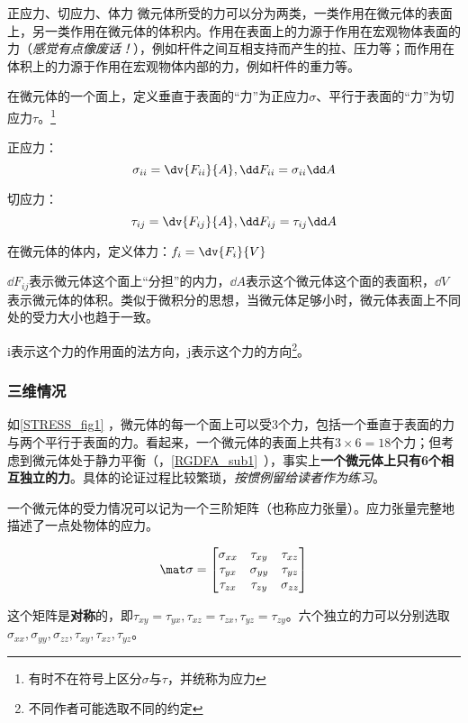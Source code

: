 \begin{definition}{正应力、切应力、体力}
微元体所受的力可以分为两类，一类作用在微元体的表面上，另一类作用在微元体的体积内。作用在表面上的力源于作用在宏观物体表面的力（\textsl{感觉有点像废话！}），例如杆件之间互相支持而产生的拉、压力等；而作用在体积上的力源于作用在宏观物体内部的力，例如杆件的重力等。

在微元体的一个面上，定义垂直于表面的“力”为正应力$\sigma$、平行于表面的“力”为切应力$\tau$。\footnote{有时不在符号上区分$\sigma$与$\tau$，并统称为应力}

正应力：$$\sigma_{ii} =\dv{F_{ii}}{A}, \dd F_{ii} = \sigma_{ii} \dd A$$

切应力：$$\tau_{ij}=\dv{F_{ij}}{A}, \dd F_{ij} = \tau_{ij} \dd A$$

在微元体的体内，定义体力：$f_i = \dv{F_i}{V}$

$\dd F_{ij}$表示微元体这个面上“分担”的内力，$\dd A$表示这个微元体这个面的表面积，$\dd V$表示微元体的体积。类似于微积分的思想，当微元体足够小时，微元体表面上不同处的受力大小也趋于一致。

i表示这个力的作用面的法方向，j表示这个力的方向\footnote{不同作者可能选取不同的约定}。
\end{definition}

\subsubsection{三维情况}
如\autoref{STRESS_fig1} ，微元体的每一个面上可以受$3$个力，包括一个垂直于表面的力与两个平行于表面的力。看起来，一个微元体的表面上共有$3\times6=18$个力；但考虑到微元体处于静力平衡（，\autoref{RGDFA_sub1}~），事实上\textbf{一个微元体上只有6个相互独立的力}。具体的论证过程比较繁琐，\textsl{按惯例留给读者作为练习}。

一个微元体的受力情况可以记为一个三阶矩阵（也称应力张量）。应力张量完整地描述了一点处物体的应力。

\begin{equation}
\mat \sigma=
\begin{bmatrix}
\sigma_{xx} & \tau_{xy} & \tau_{xz} \\
\tau_{yx} & \sigma_{yy} & \tau_{yz} \\
\tau_{zx} & \tau_{zy} & \sigma_{zz} \\
\end{bmatrix}
\end{equation}

这个矩阵是\textbf{对称}的，即$\tau_{xy} = \tau_{yx}, \tau_{xz}=\tau_{zx}, \tau_{yz}=\tau_{zy}$。六个独立的力可以分别选取 $\sigma_{xx}, \sigma_{yy},\sigma_{zz}, \tau_{xy}, \tau_{xz},  \tau_{yz}$。


